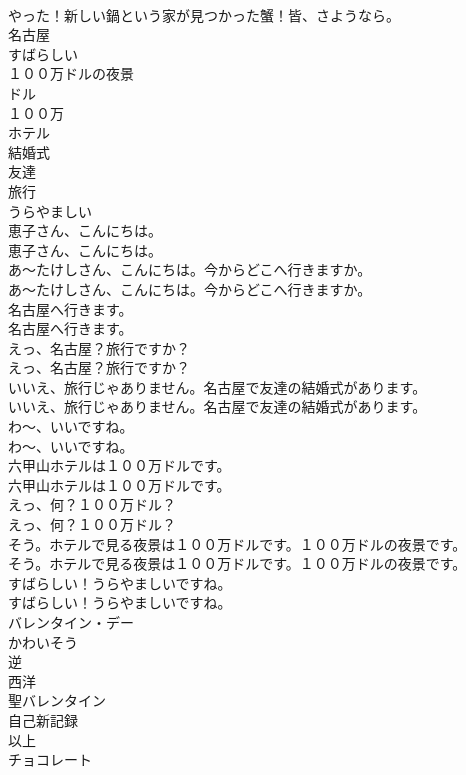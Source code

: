 \documentclass[8pt]{extreport}
\begin{document}
\begin{CJK}{UTF8}{min}
\\	やった！新しい鍋という家が見つかった蟹！皆、さようなら。 
\\	名古屋
\\	すばらしい
\\	１００万ドルの夜景
\\	ドル
\\	１００万
\\	ホテル
\\	結婚式
\\	友達
\\	旅行
\\	うらやましい
\\	恵子さん、こんにちは。	
\\	恵子さん、こんにちは。 
\\	あ〜たけしさん、こんにちは。今からどこへ行きますか。	
\\	あ〜たけしさん、こんにちは。今からどこへ行きますか。 
\\	名古屋へ行きます。	
\\	名古屋へ行きます。 
\\	えっ、名古屋？旅行ですか？	
\\	えっ、名古屋？旅行ですか？ 
\\	いいえ、旅行じゃありません。名古屋で友達の結婚式があります。	
\\	いいえ、旅行じゃありません。名古屋で友達の結婚式があります。 
\\	わ〜、いいですね。	
\\	わ〜、いいですね。 
\\	六甲山ホテルは１００万ドルです。	
\\	六甲山ホテルは１００万ドルです。 
\\	えっ、何？１００万ドル？	
\\	えっ、何？１００万ドル？ 
\\	そう。ホテルで見る夜景は１００万ドルです。１００万ドルの夜景です。	
\\	そう。ホテルで見る夜景は１００万ドルです。１００万ドルの夜景です。 
\\	すばらしい！うらやましいですね。	
\\	すばらしい！うらやましいですね。 
\\	バレンタイン・デー
\\	かわいそう
\\	逆
\\	西洋
\\	聖バレンタイン
\\	自己新記録
\\	以上
\\	チョコレート

\end{CJK}
\end{document}
